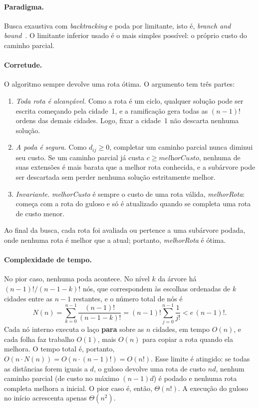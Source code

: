 \documentclass[12pt,a4paper]{article}
\newcommand{\algvar}[1]{\textit{#1}}
\begin{document}
\paragraph{Paradigma.} Busca exaustiva com \emph{backtracking} e poda por limitante, isto é, \emph{branch and bound}~\cite{land1960,little1963}. O limitante inferior usado é o mais simples possível: o próprio custo do caminho parcial.

\paragraph{Corretude.} O algoritmo sempre devolve uma rota ótima. O argumento tem três partes:
\begin{enumerate}[label=(\roman*)]
  \item \emph{Toda rota é alcançável.} Como a rota é um ciclo, qualquer solução pode ser escrita começando pela cidade~1, e a ramificação gera todas as $(n-1)!$ ordens das demais cidades. Logo, fixar a cidade~1 não descarta nenhuma solução.
  \item \emph{A poda é segura.} Como $d_{ij} \ge 0$, completar um caminho parcial nunca diminui seu custo. Se um caminho parcial já custa $c \ge \algvar{melhorCusto}$, nenhuma de suas extensões é mais barata que a melhor rota conhecida, e a subárvore pode ser descartada sem perder nenhuma solução estritamente melhor.
  \item \emph{Invariante.} \algvar{melhorCusto} é sempre o custo de uma rota válida, \algvar{melhorRota}: começa com a rota do guloso e só é atualizado quando se completa uma rota de custo menor.
\end{enumerate}
Ao final da busca, cada rota foi avaliada ou pertence a uma subárvore podada, onde nenhuma rota é melhor que a atual; portanto, \algvar{melhorRota} é ótima.

\paragraph{Complexidade de tempo.} No pior caso, nenhuma poda acontece. No nível $k$ da árvore há $(n-1)!/(n-1-k)!$ nós, que correspondem às escolhas ordenadas de $k$ cidades entre as $n - 1$ restantes, e o número total de nós é
\[
  N(n) = \sum_{k=0}^{n-1} \frac{(n-1)!}{(n-1-k)!}
       = (n-1)! \sum_{j=0}^{n-1} \frac{1}{j!}
       < e \, (n-1)! .
\]
Cada nó interno executa o laço \textbf{para} sobre as $n$ cidades, em tempo $O(n)$, e cada folha faz trabalho $O(1)$, mais $O(n)$ para copiar a rota quando ela melhora. O tempo total é, portanto, $O(n \cdot N(n)) = O(n \cdot (n-1)!) = O(n!)$. Esse limite é atingido: se todas as distâncias forem iguais a $d$, o guloso devolve uma rota de custo $nd$, nenhum caminho parcial (de custo no máximo $(n-1)d$) é podado e nenhuma rota completa melhora a inicial. O pior caso é, então, $\Theta(n!)$. A execução do guloso no início acrescenta apenas $\Theta(n^2)$.
\end{document}
